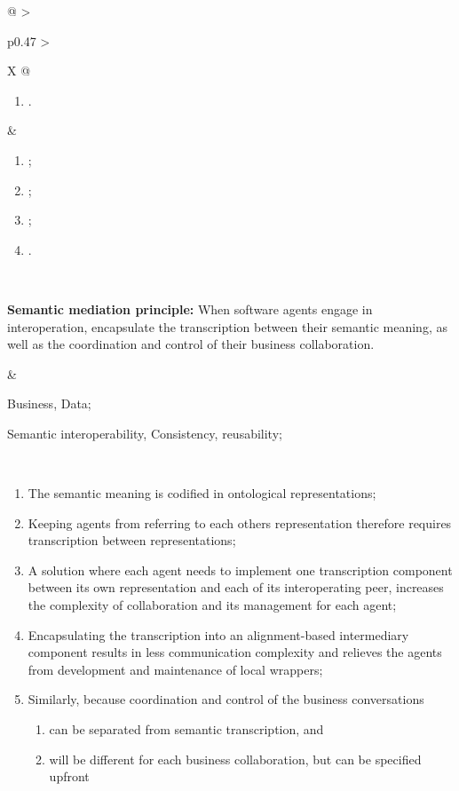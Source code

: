 \begin{xltabular}[l]{\linewidth}{@{} >{\small\raggedright\arraybackslash}p{0.47\linewidth} >{\small\raggedright\arraybackslash}X @{}}
\begin{enumerate}[left=6pt, nosep]
  \item .
\end{enumerate}
&
\begin{enumerate}[left=10pt, nosep]
  \item ;
  \item ;
  \item ;
  \item .
\end{enumerate} \\
%
%
%
\begin{mmdp}\label{dp:mediation}{\bfseries Semantic mediation principle:}
\quad When software agents engage in interoperation, encapsulate the transcription between their semantic meaning, as well as the coordination and control of their business collaboration.\end{mmdp}
&
\begin{description}[labelwidth=3.7cm,leftmargin=3.7cm+1ex,nosep,topsep=2ex,labelsep=1ex,font=\bfseries]
\item[Type of information:] Business, Data;
\item[Quality attributes:] Semantic interoperability, Consistency, reusability;
\end{description} \\
\begin{enumerate}[left=6pt, nosep]
  \item The semantic meaning is codified in ontological representations;
  \item Keeping agents from referring to each others representation therefore requires transcription between representations;
  \item A solution where each agent needs to implement one transcription component between its own representation and each of its interoperating peer, increases the complexity of collaboration and its management for each agent;
  \item Encapsulating the transcription into an alignment-based intermediary component results in less communication complexity and relieves the agents from development and maintenance of local wrappers;
  \item Similarly, because coordination and control of the business conversations
  \begin{enumerate}
    \item can be separated from semantic transcription, and
    \item will be different for each business collaboration, but can be specified upfront 

\end{enumerate}
\end{enumerate}
\end{xltabular}
